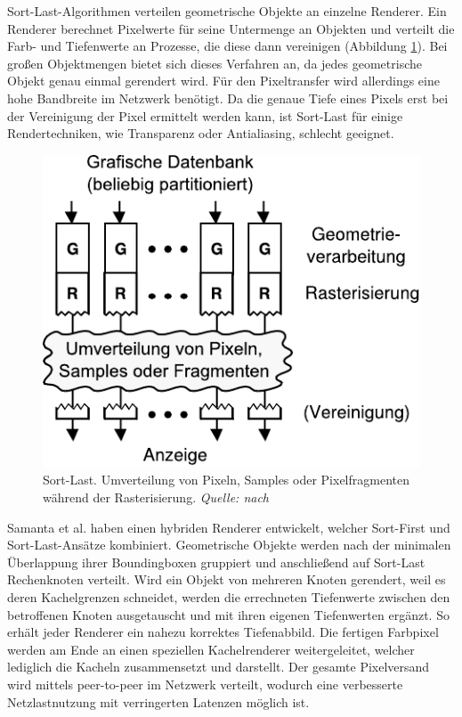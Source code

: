 Sort-Last-Algorithmen verteilen geometrische Objekte an einzelne Renderer. Ein Renderer berechnet Pixelwerte für seine Untermenge an Objekten und verteilt die Farb- und Tiefenwerte an Prozesse, die diese dann vereinigen (Abbildung \ref{fig:relwork:sortlast}). Bei großen Objektmengen bietet sich dieses Verfahren an, da jedes geometrische Objekt genau einmal gerendert wird. Für den Pixeltransfer wird allerdings eine hohe Bandbreite im Netzwerk benötigt. Da die genaue Tiefe eines Pixels erst bei der Vereinigung der Pixel ermittelt werden kann, ist Sort-Last für einige Rendertechniken, wie Transparenz oder Antialiasing, schlecht geeignet.
\begin{figure}
 \centering
  \includegraphics[scale=0.8]{images/sort-last.pdf}
  \caption{Sort-Last. Umverteilung von Pixeln, Samples oder Pixelfragmenten während der Rasterisierung. \textit{Quelle: nach \cite{molnar}}}
 \label{fig:relwork:sortlast}
\end{figure}
Samanta et al. \cite{samanta} haben einen hybriden Renderer entwickelt, welcher Sort-First und Sort-Last-Ansätze kombiniert. Geometrische Objekte werden nach der minimalen Überlappung ihrer Boundingboxen gruppiert und anschließend auf Sort-Last Rechenknoten verteilt. Wird ein Objekt von mehreren Knoten gerendert, weil es deren Kachelgrenzen schneidet, werden die errechneten Tiefenwerte zwischen den betroffenen Knoten ausgetauscht und mit ihren eigenen Tiefenwerten ergänzt. So erhält jeder Renderer ein nahezu korrektes Tiefenabbild. Die fertigen Farbpixel werden am Ende an einen speziellen Kachelrenderer weitergeleitet, welcher lediglich die Kacheln zusammensetzt und darstellt. Der gesamte Pixelversand wird mittels peer-to-peer im Netz\-werk verteilt, wodurch eine verbesserte Netzlastnutzung mit verringerten Latenzen möglich ist.\\
